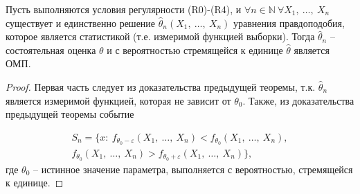\begin{corollary}
    Пусть выполняются условия регулярности (R0)-(R4), и $\displaystyle \forall n\in \mathbb{N} \ \forall X_{1} ,\ \dotsc ,\ X_{n}$ существует и единственно решение $\displaystyle \hat{\theta }_{n}( X_{1} ,\ \dotsc ,\ X_{n})$ уравнения правдоподобия, которое является статистикой (т.е. измеримой функцией выборки). Тогда $\displaystyle \hat{\theta }_{n}$ -- состоятельная оценка $\displaystyle \theta $ и с вероятностью стремящейся к единице $\displaystyle \hat{\theta }$ является ОМП.
\end{corollary}
\begin{proof}
    Первая часть следует из доказательства предыдущей теоремы, т.к. $\displaystyle \hat{\theta }_{n}$ является измеримой функцией, которая не зависит от $\displaystyle \theta _{0}$. Также, из доказательства предыдущей теоремы событие
    
    
    \begin{gather*}
    S_{n} =\{x:\ f_{\theta _{0} -\varepsilon }( X_{1} ,\ \dotsc ,\ X_{n}) < f_{\theta _{0}}( X_{1} ,\ \dotsc ,\ X_{n}) ,\\
    f_{\theta _{0}}( X_{1} ,\ \dotsc ,\ X_{n})  >f_{\theta _{0} +\varepsilon }( X_{1} ,\ \dotsc ,\ X_{n})\} ,
    \end{gather*}
    где $\displaystyle \theta _{0}$ -- истинное значение параметра, выполняется с вероятностью, стремящейся к единице.
    
    
    
    
    
    
    
\end{proof}
